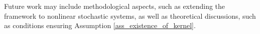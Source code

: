 \documentclass{IEEEtran}
\begin{document}
Future work may include methodological aspects, such as extending the framework to nonlinear stochastic systems, as well as theoretical discussions, such as conditions ensuring Assumption \ref{ass_existence_of_kernel}.









\end{document}
